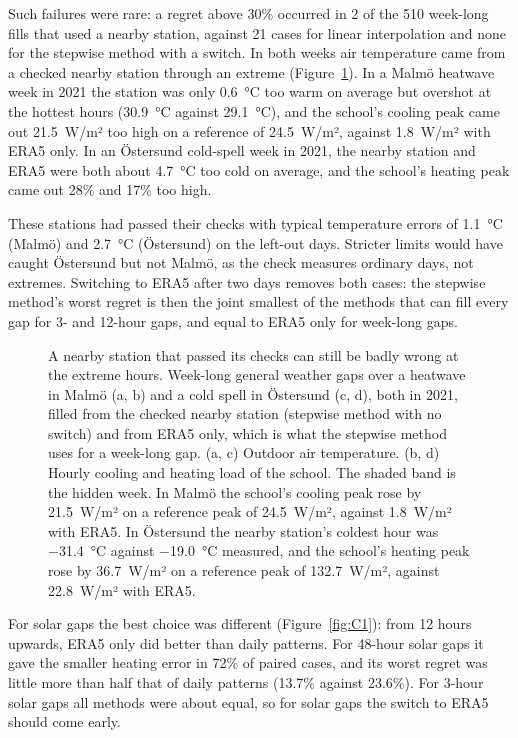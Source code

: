 Such failures were rare: a regret above 30\% occurred in 2 of the 510 week-long fills that used a nearby station, against 21 cases for linear interpolation and none for the stepwise method with a switch. In both weeks air temperature came from a checked nearby station through an extreme (Figure~\ref{fig:12}). In a Malmö heatwave week in 2021 the station was only 0.6~°C too warm on average but overshot at the hottest hours (30.9~°C against 29.1~°C), and the school's cooling peak came out 21.5~W/m² too high on a reference of 24.5~W/m², against 1.8~W/m² with ERA5 only. In an Östersund cold-spell week in 2021, the nearby station and ERA5 were both about 4.7~°C too cold on average, and the school's heating peak came out 28\% and 17\% too high.

These stations had passed their checks with typical temperature errors of 1.1~°C (Malmö) and 2.7~°C (Östersund) on the left-out days. Stricter limits would have caught Östersund but not Malmö, as the check measures ordinary days, not extremes. Switching to ERA5 after two days removes both cases: the stepwise method's worst regret is then the joint smallest of the methods that can fill every gap for 3- and 12-hour gaps, and equal to ERA5 only for week-long gaps.

\begin{figure}[tbp]
\centering
{}
\caption{A nearby station that passed its checks can still be badly wrong at the extreme hours. Week-long general weather gaps over a heatwave in Malmö (a, b) and a cold spell in Östersund (c, d), both in 2021, filled from the checked nearby station (stepwise method with no switch) and from ERA5 only, which is what the stepwise method uses for a week-long gap. (a, c) Outdoor air temperature. (b, d) Hourly cooling and heating load of the school. The shaded band is the hidden week. In Malmö the school's cooling peak rose by 21.5~W/m² on a reference peak of 24.5~W/m², against 1.8~W/m² with ERA5. In Östersund the nearby station's coldest hour was −31.4~°C against −19.0~°C measured, and the school's heating peak rose by 36.7~W/m² on a reference peak of 132.7~W/m², against 22.8~W/m² with ERA5.}
\label{fig:12}
\end{figure}

For solar gaps the best choice was different (Figure~\ref{fig:C1}): from 12 hours upwards, ERA5 only did better than daily patterns. For 48-hour solar gaps it gave the smaller heating error in 72\% of paired cases, and its worst regret was little more than half that of daily patterns (13.7\% against 23.6\%). For 3-hour solar gaps all methods were about equal, so for solar gaps the switch to ERA5 should come early.

